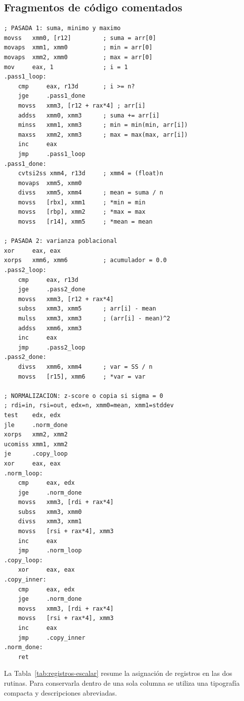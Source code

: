 \documentclass[journal]{IEEEtran}
\begin{document}
\subsection{Fragmentos de código comentados}
\begin{lstlisting}[language={[x86masm]Assembler},caption={Bucles principales de \texttt{stats\_scalar.asm}.},label={lst:escalar}]
; PASADA 1: suma, minimo y maximo
movss   xmm0, [r12]         ; suma = arr[0]
movaps  xmm1, xmm0          ; min = arr[0]
movaps  xmm2, xmm0          ; max = arr[0]
mov     eax, 1              ; i = 1
.pass1_loop:
    cmp     eax, r13d       ; i >= n?
    jge     .pass1_done
    movss   xmm3, [r12 + rax*4] ; arr[i]
    addss   xmm0, xmm3      ; suma += arr[i]
    minss   xmm1, xmm3      ; min = min(min, arr[i])
    maxss   xmm2, xmm3      ; max = max(max, arr[i])
    inc     eax
    jmp     .pass1_loop
.pass1_done:
    cvtsi2ss xmm4, r13d     ; xmm4 = (float)n
    movaps  xmm5, xmm0
    divss   xmm5, xmm4      ; mean = suma / n
    movss   [rbx], xmm1     ; *min = min
    movss   [rbp], xmm2     ; *max = max
    movss   [r14], xmm5     ; *mean = mean

; PASADA 2: varianza poblacional
xor     eax, eax
xorps   xmm6, xmm6          ; acumulador = 0.0
.pass2_loop:
    cmp     eax, r13d
    jge     .pass2_done
    movss   xmm3, [r12 + rax*4]
    subss   xmm3, xmm5      ; arr[i] - mean
    mulss   xmm3, xmm3      ; (arr[i] - mean)^2
    addss   xmm6, xmm3
    inc     eax
    jmp     .pass2_loop
.pass2_done:
    divss   xmm6, xmm4      ; var = SS / n
    movss   [r15], xmm6     ; *var = var

; NORMALIZACION: z-score o copia si sigma = 0
; rdi=in, rsi=out, edx=n, xmm0=mean, xmm1=stddev
test    edx, edx
jle     .norm_done
xorps   xmm2, xmm2
ucomiss xmm1, xmm2
je      .copy_loop
xor     eax, eax
.norm_loop:
    cmp     eax, edx
    jge     .norm_done
    movss   xmm3, [rdi + rax*4]
    subss   xmm3, xmm0
    divss   xmm3, xmm1
    movss   [rsi + rax*4], xmm3
    inc     eax
    jmp     .norm_loop
.copy_loop:
    xor     eax, eax
.copy_inner:
    cmp     eax, edx
    jge     .norm_done
    movss   xmm3, [rdi + rax*4]
    movss   [rsi + rax*4], xmm3
    inc     eax
    jmp     .copy_inner
.norm_done:
    ret
\end{lstlisting}

La Tabla~\ref{tab:registros-escalar} resume la asignación de registros en las
dos rutinas. Para conservarla dentro de una sola columna se utiliza una
tipografía compacta y descripciones abreviadas.
\end{document}
